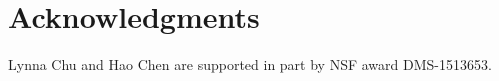 \documentclass[arxiv, preprint]{imsart}
\numberwithin{equation}{section}
\theoremstyle{plain}
\begin{document}
%
%
%
%
%


\section*{Acknowledgments}
Lynna Chu and Hao Chen are supported in part by NSF award DMS-1513653.



\end{document}
